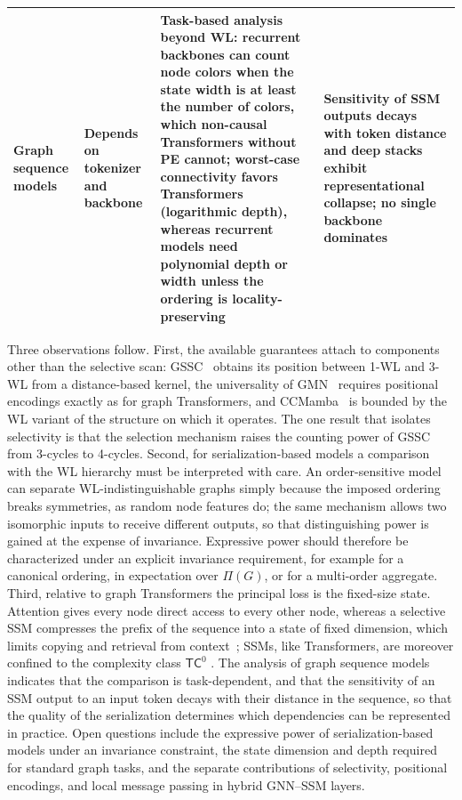 \documentclass[acmsmall]{acmart}
\begin{document}
\begin{table}[!htbp]
{\begin{tabular}{>{\raggedright\arraybackslash}p{3.0cm} >{\raggedright\arraybackslash}p{2.8cm} >{\raggedright\arraybackslash}p{5.6cm} >{\raggedright\arraybackslash}p{5.0cm}}
\midrule

Graph sequence models~\cite{behrouz2024best} &
Depends on tokenizer and backbone &
Task-based analysis beyond WL: recurrent backbones can count node colors when
the state width is at least the number of colors, which non-causal Transformers
without PE cannot; worst-case connectivity favors Transformers (logarithmic
depth), whereas recurrent models need polynomial depth or width unless the
ordering is locality-preserving &
Sensitivity of SSM outputs decays with token distance and deep stacks exhibit
representational collapse; no single backbone dominates \\

\bottomrule
\end{tabular}}
\end{table}

Three observations follow. First, the available guarantees attach to
components other than the selective scan: GSSC~\cite{huang2024can} obtains its
position between 1-WL and 3-WL from a distance-based kernel, the universality
of GMN~\cite{behrouz2024graph} requires positional encodings exactly as for
graph Transformers, and CCMamba~\cite{chen2026ccmamba} is bounded by the WL
variant of the structure on which it operates. The one result that isolates
selectivity is that the selection mechanism raises the counting power of GSSC
from 3-cycles to 4-cycles. Second, for serialization-based models a comparison
with the WL hierarchy must be interpreted with care. An order-sensitive model
can separate WL-indistinguishable graphs simply because the imposed ordering
breaks symmetries, as random node features do; the same mechanism allows two
isomorphic inputs to receive different outputs, so that distinguishing power
is gained at the expense of invariance. Expressive power should therefore be
characterized under an explicit invariance requirement, for example for a
canonical ordering, in expectation over $\Pi(G)$, or for a multi-order
aggregate. Third, relative to graph Transformers the principal loss is the
fixed-size state. Attention gives every node direct access to every other
node, whereas a selective SSM compresses the prefix of the sequence into a
state of fixed dimension, which limits copying and retrieval from
context~\cite{jelassi2024repeat}; SSMs, like Transformers, are moreover
confined to the complexity class $\mathsf{TC}^0$ \cite{merrill2024illusion}.
The analysis of graph sequence models~\cite{behrouz2024best} indicates that
the comparison is task-dependent, and that the sensitivity of an SSM output to
an input token decays with their distance in the sequence, so that the quality
of the serialization determines which dependencies can be represented in
practice. Open questions include the expressive power of serialization-based
models under an invariance constraint, the state dimension and depth required
for standard graph tasks, and the separate contributions of selectivity,
positional encodings, and local message passing in hybrid GNN--SSM layers.
\end{document}
